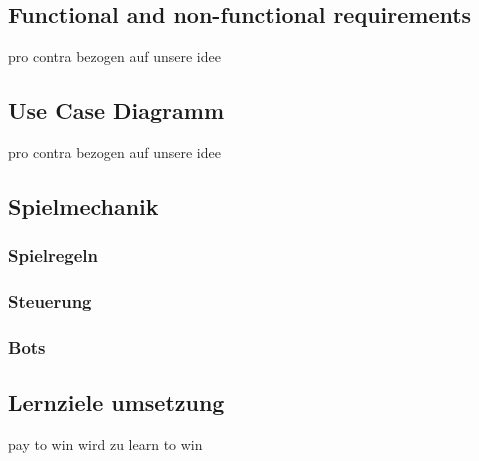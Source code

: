 \subsection{Functional and non-functional requirements}
	pro contra bezogen auf unsere idee
\subsection{Use Case Diagramm}
	pro contra bezogen auf unsere idee
\subsection{Spielmechanik}
	\subsubsection{Spielregeln}
	\subsubsection{Steuerung}
	\subsubsection{Bots}
\subsection{Lernziele umsetzung}
	pay to win  wird zu  learn to win
